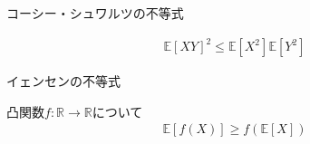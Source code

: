 \documentclass[lualatex,handout]{beamer}
\newcommand{\expt}[1]{\mathbb{E}\left[#1\right]}
\theoremstyle{definition}
\begin{document}
\begin{frame}{コーシー・シュワルツの不等式}
\begin{theorem}
\begin{align*}
\expt{XY}^2 \le \expt{X^2}\expt{Y^2}
\end{align*}
\end{theorem}
\end{frame}

\begin{frame}{イェンセンの不等式}
\begin{theorem}
凸関数$f\colon\mathbb{R}\to\mathbb{R}$について
\begin{align*}
\expt{f(X)} \ge f(\expt{X})
\end{align*}
\end{theorem}

\end{frame}
\fi

\end{document}
